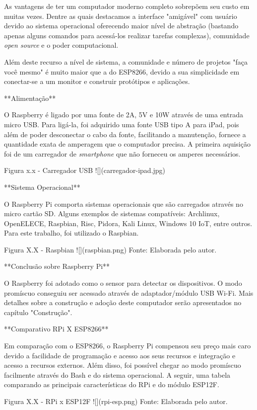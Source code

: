 As vantagens de ter um computador moderno completo sobrepõem seu custo em muitas
vezes. Dentre as quais destacamos a interface "amigável" com usuário devido ao
sistema operacional oferecendo maior nível de abstração (bastando apenas alguns
comandos para acessá-los realizar tarefas complexas), comunidade \emph{open
source} e o poder computacional.

Além deste recurso a nível de sistema, a comunidade e número de projetos "faça
você mesmo" é muito maior que a do ESP8266, devido a sua simplicidade em
conectar-se a um monitor e construir protótipos e aplicações.

**Alimentação**

O Raspberry é ligado por uma fonte de 2A, 5V e 10W através de uma entrada micro
USB. Para ligá-la, foi adquirido uma fonte USB tipo A para iPad, pois além de
poder desconectar o cabo da fonte, facilitando a manutenção, fornece a
quantidade exata de amperagem que o computador precisa. A primeira aquisição foi
de um carregador de \emph{smartphone} que não forneceu os amperes necessários.

Figura x.x - Carregador USB
![](carregador-ipad.jpg)

**Sistema Operacional**

O Raspberry Pi comporta sistemas operacionais que são carregados através no
micro cartão SD. Alguns exemplos de sistemas compatíveis: Archlinux, OpenELECE,
Raspbian, Risc, Pidora, Kali Linux, Windows 10 IoT, entre outros. Para este
trabalho, foi utilizado o Raspbian.

Figura X.X - Raspbian
![](raspbian.png)
Fonte: Elaborada pelo autor.

**Conclusão sobre Raspberry Pi**

O Raspberry foi adotado como o sensor para detectar os dispositivos. O modo
promíscuo conseguiu ser acessado através de adaptador/módulo USB Wi-Fi. Mais
detalhes sobre a construção e adoção deste computador serão apresentados no
capítulo "Construção".

**Comparativo RPi X ESP8266**

Em comparação com o ESP8266, o Raspberry Pi compensou seu preço mais caro devido
a facilidade de programação e acesso aos seus recursos e integração e acesso a
recursos externos. Além disso, foi possível chegar ao modo promíscuo facilmente
através do Bash e do sistema operacional. A seguir, uma tabela comparando as
principais características do RPi e do módulo ESP12F.

Figura X.X - RPi x ESP12F
![](rpi-esp.png)
Fonte: Elaborada pelo autor.

